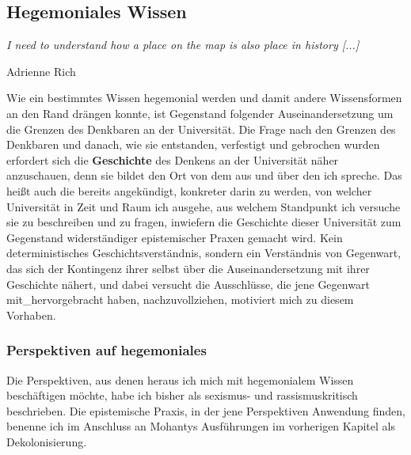 \subsection{Hegemoniales Wissen}
\epigraph{\textit{ 
I need to understand how a place on the map is also place in history [...]
}}{Adrienne Rich \footnotemark}  

Wie ein bestimmtes Wissen hegemonial werden und damit andere Wissensformen an
den Rand drängen konnte, ist Gegenstand folgender Auseinandersetzung um die
Grenzen des Denkbaren an der Universität. Die Frage nach den Grenzen des
Denkbaren und danach, wie sie entstanden, verfestigt und gebrochen wurden
erfordert sich die \textbf{Geschichte} des Denkens an der Universität näher anzuschauen,
denn sie bildet den Ort von dem aus und über den ich spreche. Das heißt auch
die bereits angekündigt, konkreter darin zu werden, von welcher Universität in
Zeit und Raum ich ausgehe, aus welchem Standpunkt ich versuche sie zu
beschreiben und zu fragen, inwiefern die Geschichte dieser Universität zum
Gegenstand widerständiger epistemischer Praxen gemacht wird. Kein
deterministisches Geschichtsverständnis, sondern ein Verständnis von Gegenwart,
das sich der Kontingenz ihrer selbst über die Auseinandersetzung mit ihrer
Geschichte nähert, und dabei versucht die Ausschlüsse, die jene Gegenwart
mit\_hervorgebracht haben, nachzuvollziehen, motiviert mich zu diesem Vorhaben. 
\subsubsection{Perspektiven auf hegemoniales}

Die Perspektiven, aus denen heraus ich mich mit  hegemonialem Wissen
beschäftigen möchte, habe ich bisher als sexismus- und rassismuskritisch
beschrieben. Die epistemische Praxis, in der jene Perspektiven Anwendung
finden,  benenne ich im Anschluss an Mohantys Ausführungen im vorherigen
Kapitel als Dekolonisierung. 

